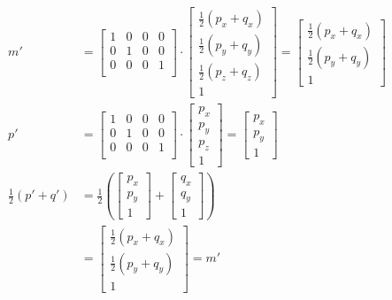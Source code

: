 \documentclass{article} %
\begin{document}
\begin{align*}
m' &=
\begin{bmatrix}
1 & 0 & 0 & 0\\
0 & 1 & 0 & 0\\
0 & 0 & 0 & 1\\
\end{bmatrix}
\cdot
\begin{bmatrix}
\frac{1}{2}(p_x + q_x)\\
\frac{1}{2}(p_y + q_y)\\
\frac{1}{2}(p_z + q_z)\\
1
\end{bmatrix}
=
\begin{bmatrix}
\frac{1}{2}(p_x + q_x)\\
\frac{1}{2}(p_y + q_y)\\
1
\end{bmatrix}\\
p' &=
\begin{bmatrix}
1 & 0 & 0 & 0\\
0 & 1 & 0 & 0\\
0 & 0 & 0 & 1\\
\end{bmatrix}
\cdot
\begin{bmatrix}
p_x\\
p_y\\
p_z\\
1
\end{bmatrix} = \begin{bmatrix}
p_x\\
p_y\\
1
\end{bmatrix}\\
\frac{1}{2}\left(p' + q'\right) &=
\frac{1}{2}
\left(
\begin{bmatrix}
p_x\\
p_y\\
1
\end{bmatrix}
+
\begin{bmatrix}
q_x\\
q_y\\
1
\end{bmatrix}
\right)\\
&=
\begin{bmatrix}
\frac{1}{2}(p_x + q_x)\\
\frac{1}{2}(p_y + q_y)\\
1
\end{bmatrix}= m'
\end{align*}

\end{document}
